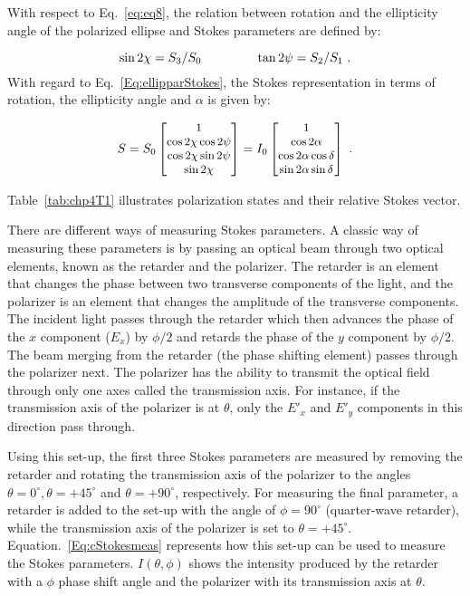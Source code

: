 With respect to Eq.~\ref{eq:eq8}, the relation between rotation and the ellipticity angle of the polarized ellipse and Stokes parameters are defined by: 

\begin{equation}\label{Eq:ellipparStokes}
\small
	\sin 2\chi = S_{3}/S_{0}   \hspace{1.5cm} \tan 2\psi = S_{2}/S_{1}~.
\end{equation} 
\noindent With regard to Eq.~\ref{Eq:ellipparStokes}, the Stokes representation in terms of rotation, the ellipticity angle and $\alpha$ is given by: 

\begin{equation}\label{Eq:nrStokesvec}
\small
S = 	 S_{0}
	\begin{bmatrix}
	1 \\
	\cos 2\chi \cos 2\psi\\
	\cos 2\chi \sin 2\psi\\	
	\sin 2\chi
	\end{bmatrix} 
	= I_{0}
	\begin{bmatrix}
	1\\
	\cos 2\alpha \\
	\cos 2\alpha \cos\delta\\	
	\sin 2\alpha \sin\delta
	\end{bmatrix}~.
\end{equation}

Table~\ref{tab:chp4T1} illustrates polarization states and their relative Stokes vector.

There are different ways of measuring Stokes parameters. 
A classic way of measuring these parameters is by passing an optical beam through two optical elements, known as the retarder and the polarizer.
The retarder is an element that changes the phase between two transverse components of the light, and the polarizer is an element that changes the amplitude of the transverse components.
The incident light passes through the retarder which then advances the phase of the $x$ component ($E_{x}$) by  $\phi/2$ and retards the phase of the $y$ component by $\phi/2$. 
The beam merging from the retarder (the phase shifting element) passes through the polarizer next.
The polarizer has the ability to transmit the optical field through only one axes called the transmission axis. 
For instance, if the transmission axis of the polarizer is at $\theta$, only the $E'_{x}$ and $E'_{y}$ components in this direction pass through.

Using this set-up, the first three Stokes parameters are measured by removing the retarder and rotating the transmission axis of the polarizer to the angles $\theta = 0^{\circ}, \theta = +45^{\circ}$ and $\theta = +90^{\circ}$, respectively.
For measuring the final parameter, a retarder is added to the set-up with the angle of $\phi = 90^{\circ}$ (quarter-wave retarder), while the transmission axis of the polarizer is set to $\theta = +45^{\circ}$.
Equation.~\ref{Eq:cStokesmeas} represents how this set-up can be used to measure the Stokes parameters.
$I(\theta, \phi)$ shows the intensity produced by the retarder with a $\phi$ phase shift angle and the polarizer with its transmission axis at $\theta$.


